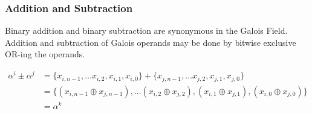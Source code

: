 \subsubsection{Addition and Subtraction} Binary addition and binary subtraction
are synonymous in the Galois Field. Addition and subtraction of Galois operands
may be done by bitwise exclusive OR-ing the operands.

    \begin{equation*}
        \begin{split}
            \alpha^{i} \pm \alpha^{j} & = \{ x_{i, n-1}, \ldots x_{i, 2},
            x_{i, 1}, x_{i, 0} \} + \{ x_{j, n-1}, \ldots x_{j, 2}, x_{j, 1},
            x_{j, 0} \} \\
            & = \{(x_{i, n-1} \oplus x_{j,n-1}), \ldots (x_{i, 2} \oplus x_{j,
            2}), (x_{i, 1}\oplus x_{j, 1}), (x_{i, 0}\oplus x_{j, 0})\} \\
            & = \alpha^{k}
        \end{split}
    \end{equation*}

